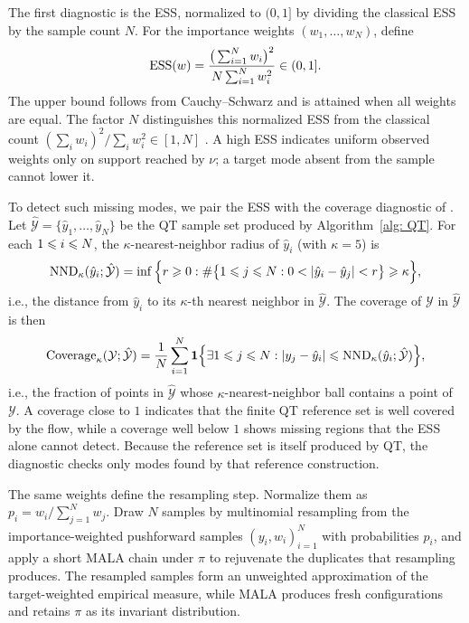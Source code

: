 \documentclass{article}
\begin{document}
The first diagnostic is the ESS, normalized to $(0,1]$ by dividing the classical ESS by the sample count $N$. For the importance weights $(w_1,\dots,w_N)$, define
\begin{equation}
    \mathrm{ESS}(w) = \frac{\big(\sum_{i=1}^{N} w_i\big)^2}{N \sum_{i=1}^{N} w_i^2} \in (0,1].
    \label{eq: ESS}
\end{equation}
The upper bound follows from Cauchy--Schwarz and is attained when all weights are equal. The factor $N$ distinguishes this normalized ESS from the classical count $(\sum_iw_i)^2/\sum_iw_i^2\in[1,N]$ \citep{martino2017rethinking}. A high ESS indicates uniform observed weights only on support reached by $\nu$; a target mode absent from the sample cannot lower it.

To detect such missing modes, we pair the ESS with the coverage diagnostic of \citet{naeem2020reliable}. Let $\hat{\mathcal Y} = \{\hat y_1,\dots,\hat y_N\}$ be the QT sample set produced by Algorithm~\ref{alg: QT}. For each $1 \leqslant i \leqslant N$, the $\kappa$-nearest-neighbor radius of $\hat y_i$ (with $\kappa = 5$) is
\begin{equation}
    \mathrm{NND}_\kappa(\hat y_i;{\hat{\mathcal Y}}) = \inf\Big\{ r \geqslant 0 :
    \# \big\{1\leqslant j \leqslant N: 0 < |\hat y_i - \hat y_j| < r\big\} \geqslant \kappa
    \Big\},
\end{equation}
i.e., the distance from $\hat y_i$ to its $\kappa$-th nearest neighbor in $\hat{\mathcal Y}$. The coverage of $\mathcal Y$ in $\hat{\mathcal Y}$ is then
\begin{equation}
    \mathrm{Coverage}_\kappa({\mathcal Y;\hat{\mathcal Y}}) =
    \frac{1}{N} \sum_{i=1}^{N} \mathbf 1\Bigl\{
        \exists  1\leqslant j\leqslant N : |y_j - \hat y_i| \leqslant \mathrm{NND}_\kappa(\hat y_i;\hat{\mathcal Y})
    \Bigr\},
\end{equation}
i.e., the fraction of points in $\hat{\mathcal Y}$ whose $\kappa$-nearest-neighbor ball contains a point of $\mathcal Y$. A coverage close to $1$ indicates that the finite QT reference set is well covered by the flow, while a coverage well below $1$ shows missing regions that the ESS alone cannot detect. Because the reference set is itself produced by QT, the diagnostic checks only modes found by that reference construction.

The same weights define the resampling step. Normalize them as $p_i=w_i/\sum_{j=1}^{N}w_j$. Draw $N$ samples by multinomial resampling from the importance-weighted pushforward samples $(y_i,w_i)_{i=1}^{N}$ with probabilities $p_i$, and apply a short MALA chain under $\pi$ to rejuvenate the duplicates that resampling produces. The resampled samples form an unweighted approximation of the target-weighted empirical measure, while MALA produces fresh configurations and retains $\pi$ as its invariant distribution.
\end{document}
